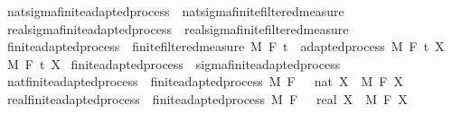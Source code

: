 \begin{isabellebody}
\isanewline
{}\isamarkupfalse%
\ nat{\isacharunderscore}{\kern0pt}sigma{\isacharunderscore}{\kern0pt}finite{\isacharunderscore}{\kern0pt}adapted{\isacharunderscore}{\kern0pt}process\ {\isasymsubseteq}\ nat{\isacharunderscore}{\kern0pt}sigma{\isacharunderscore}{\kern0pt}finite{\isacharunderscore}{\kern0pt}filtered{\isacharunderscore}{\kern0pt}measure%
\isadelimproof
\ %
\endisadelimproof
%
\isatagproof
\isacommand{{\isachardot}{\kern0pt}{\isachardot}{\kern0pt}}\isamarkupfalse%
%
\endisatagproof
{\isafoldproof}%
%
\isadelimproof
%
\endisadelimproof
\isanewline
{}\isamarkupfalse%
\ real{\isacharunderscore}{\kern0pt}sigma{\isacharunderscore}{\kern0pt}finite{\isacharunderscore}{\kern0pt}adapted{\isacharunderscore}{\kern0pt}process\ {\isasymsubseteq}\ real{\isacharunderscore}{\kern0pt}sigma{\isacharunderscore}{\kern0pt}finite{\isacharunderscore}{\kern0pt}filtered{\isacharunderscore}{\kern0pt}measure%
\isadelimproof
\ %
\endisadelimproof
%
\isatagproof
\isacommand{{\isachardot}{\kern0pt}{\isachardot}{\kern0pt}}\isamarkupfalse%
%
\endisatagproof
{\isafoldproof}%
%
\isadelimproof
%
\endisadelimproof
\isanewline
\isanewline
{}\isamarkupfalse%
\ finite{\isacharunderscore}{\kern0pt}adapted{\isacharunderscore}{\kern0pt}process\ {\isacharequal}{\kern0pt}\ finite{\isacharunderscore}{\kern0pt}filtered{\isacharunderscore}{\kern0pt}measure\ M\ F\ t\ {\isacharplus}{\kern0pt}\ adapted{\isacharunderscore}{\kern0pt}process\ M\ F\ t\ X\ \ M\ F\ t\ X\isanewline
\isanewline
{}\isamarkupfalse%
\ finite{\isacharunderscore}{\kern0pt}adapted{\isacharunderscore}{\kern0pt}process\ {\isasymsubseteq}\ sigma{\isacharunderscore}{\kern0pt}finite{\isacharunderscore}{\kern0pt}adapted{\isacharunderscore}{\kern0pt}process%
\isadelimproof
\ %
\endisadelimproof
%
\isatagproof
\isacommand{{\isachardot}{\kern0pt}{\isachardot}{\kern0pt}}\isamarkupfalse%
%
\endisatagproof
{\isafoldproof}%
%
\isadelimproof
%
\endisadelimproof
\isanewline
\isanewline
{}\isamarkupfalse%
\ nat{\isacharunderscore}{\kern0pt}finite{\isacharunderscore}{\kern0pt}adapted{\isacharunderscore}{\kern0pt}process\ {\isacharequal}{\kern0pt}\ finite{\isacharunderscore}{\kern0pt}adapted{\isacharunderscore}{\kern0pt}process\ M\ F\ {\isachardoublequoteopen}{}\ {\isacharcolon}{\kern0pt}{\isacharcolon}{\kern0pt}\ nat{\isachardoublequoteclose}\ X\ \ M\ F\ X\isanewline
{}\isamarkupfalse%
\ real{\isacharunderscore}{\kern0pt}finite{\isacharunderscore}{\kern0pt}adapted{\isacharunderscore}{\kern0pt}process\ {\isacharequal}{\kern0pt}\ finite{\isacharunderscore}{\kern0pt}adapted{\isacharunderscore}{\kern0pt}process\ M\ F\ {\isachardoublequoteopen}{}\ {\isacharcolon}{\kern0pt}{\isacharcolon}{\kern0pt}\ real{\isachardoublequoteclose}\ X\ \ M\ F\ X\isanewline

\end{isabellebody}
